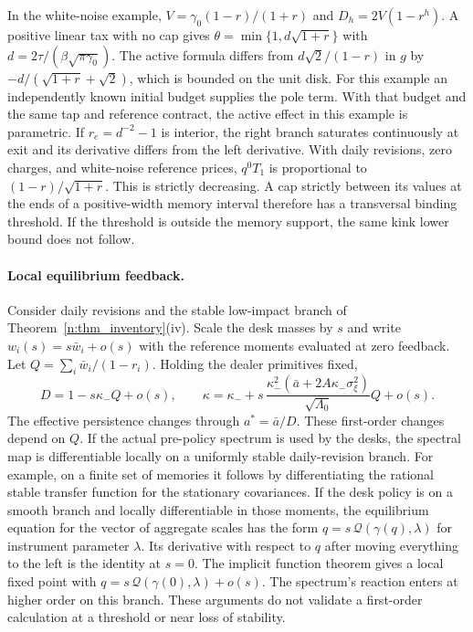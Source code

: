 \documentclass[12pt]{article}
\theoremstyle{definition}
\theoremstyle{remark}
\begin{document}
In the white-noise example, $V=\gamma_0(1-r)/(1+r)$ and
$D_h=2V(1-r^h)$. A positive linear tax with no cap gives
$\theta=\min\{1,d\sqrt{1+r}\}$ with $d=2\tau/(\beta\sqrt{\pi\gamma_0})$.
The active formula differs from $d\sqrt{2}/(1-r)$ in $g$ by
$-d/(\sqrt{1+r}+\sqrt{2})$, which is bounded on the unit disk. For this example
an independently known initial budget supplies the pole term. With that budget and the same tap and reference contract, the active effect in this example is parametric. If $r_e=d^{-2}-1$ is interior,
the right branch saturates continuously at exit and its derivative differs from
the left derivative. With daily revisions, zero charges, and white-noise reference
prices, $q^0 T_1$ is proportional to $(1-r)/\sqrt{1+r}$. This is strictly decreasing.
A cap strictly between its values at the ends of a positive-width memory interval
therefore has a transversal binding threshold. If the threshold is outside the
memory support, the same kink lower bound does not follow.

\paragraph{Local equilibrium feedback.}
Consider daily revisions and the stable low-impact branch of
Theorem~\ref{n:thm_inventory}(iv). Scale the desk masses by $s$ and write
$w_i(s)=s\bar w_i+o(s)$ with the reference moments evaluated at zero feedback.
Let $Q=\sum_i\bar w_i/(1-r_i)$. Holding the dealer primitives fixed,
\[
 D=1-s\kappa_-Q+o(s),\qquad
 \kappa=\kappa_-+
 s\,\frac{\kappa_-^2(\bar a+2A\kappa_-\sigma_\xi^2)}{\sqrt{\Lambda_0}}Q+o(s).
\]
The effective persistence changes through $a^*=\bar a/D$. These first-order changes
depend on $Q$. If the actual pre-policy spectrum is used by the desks, the spectral
map is differentiable locally on a uniformly stable daily-revision branch. For example,
on a finite set of memories it follows by differentiating the rational stable
transfer function for the stationary covariances. If the desk policy is on a smooth
branch and locally differentiable in those moments, the equilibrium equation for the
vector of aggregate scales has the form $q=s\,\mathcal Q(\gamma(q),\lambda)$ for
instrument parameter $\lambda$. Its derivative with respect to $q$ after moving
everything to the left is the identity at $s=0$. The implicit function theorem gives
a local fixed point with $q=s\,\mathcal Q(\gamma(0),\lambda)+o(s)$. The spectrum's
reaction enters at higher order on this branch. These arguments do not validate a
first-order calculation at a threshold or near loss of stability.
\end{document}
